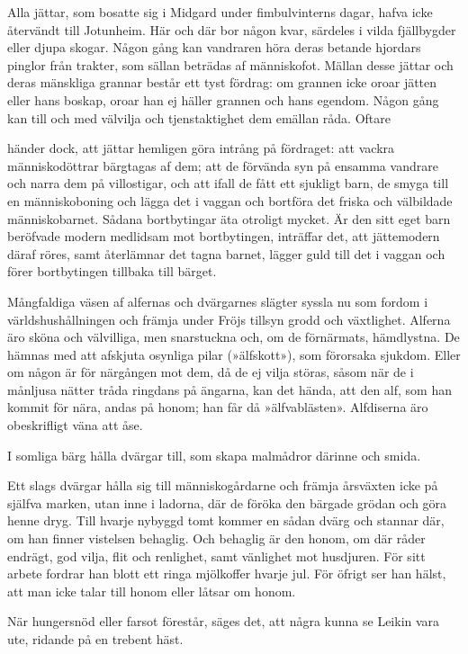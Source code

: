 Alla jättar, som bosatte sig i Midgard under fimbulvinterns dagar, hafva
icke återvändt till Jotunheim. Här och där bor någon kvar, särdeles i
vilda fjällbygder eller djupa skogar. Någon gång kan vandraren höra
deras betande hjordars pinglor från trakter, som sällan beträdas af
människofot. Mällan desse jättar och deras mänskliga grannar består ett
tyst fördrag: om grannen icke oroar jätten eller hans boskap, oroar han
ej häller grannen och hans egendom. Någon gång kan till och med välvilja
och tjenstaktighet dem emällan råda. Oftare

händer dock, att jättar hemligen göra intrång på fördraget: att vackra
människodöttrar bärgtagas af dem; att de förvända syn på ensamma
vandrare och narra dem på villostigar, och att ifall de fått ett
sjukligt barn, de smyga till en människoboning och lägga det i vaggan
och bortföra det friska och välbildade människobarnet. Sådana
bortbytingar äta otroligt mycket. Är den sitt eget barn beröfvade modern
medlidsam mot bortbytingen, inträffar det, att jättemodern däraf röres,
samt återlämnar det tagna barnet, lägger guld till det i vaggan och
förer bortbytingen tillbaka till bärget.

Mångfaldiga väsen af alfernas och dvärgarnes slägter syssla nu som
fordom i världshushållningen och främja under Fröjs tillsyn grodd och
växtlighet. Alferna äro sköna och välvilliga, men snarstuckna och, om de
förnärmats, hämdlystna. De hämnas med att afskjuta osynliga pilar
(»älfskott»), som förorsaka sjukdom. Eller om någon är för närgången mot
dem, då de ej vilja störas, såsom när de i månljusa nätter tråda
ringdans på ängarna, kan det hända, att den alf, som han kommit för
nära, andas på honom; han får då »älfvablästen». Alfdiserna äro
obeskrifligt väna att åse.

I somliga bärg hålla dvärgar till, som skapa malmådror därinne och
smida.

Ett slags dvärgar hålla sig till människogårdarne och främja årsväxten
icke på själfva marken, utan inne i ladorna, där de föröka den bärgade
grödan och göra henne dryg. Till hvarje nybyggd tomt kommer en sådan
dvärg och stannar där, om han finner vistelsen behaglig. Och behaglig är
den honom, om där råder endrägt, god vilja, flit och renlighet, samt
vänlighet mot husdjuren. För sitt arbete fordrar han blott ett ringa
mjölkoffer hvarje jul. För öfrigt ser han hälst, att man icke talar till
honom eller låtsar om honom.

När hungersnöd eller farsot förestår, säges det, att några kunna se
Leikin vara ute, ridande på en trebent häst.

